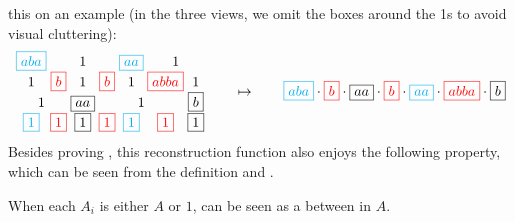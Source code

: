 this on an example (in the three views, we omit the boxes around the 1s to avoid
visual cluttering):
\[\arraycolsep=1.4pt\def\arraystretch{1.2}
  \begin{array}{ccccccc}
    \blue{\boxed{aba}}
    & & 1 & &
    \blue{\boxed{aa}} & \multicolumn{2}{c}{1} \\
    1 &
    \red{\boxed{b}} &  
    1 & 
    \red{\boxed{b}} & 
    1 & 
      \red{\boxed{abba}} & 1\\
     \multicolumn{2}{c}{1} & 
    \boxed{aa} & \multicolumn{3}{c}{1} & 
    \boxed{b}\\
    \blue{\boxed{1}} &
    \red{\boxed{1}} &
    \boxed{1} &
    \red{\boxed{1}} &
    \blue{\boxed{1}} &
    \red{\boxed{1}} &
    \boxed{1}
  \end{array}
  \qquad\mapsto\qquad \blue{\boxed{aba}} \cdot 
  \red{\boxed{b}} \cdot 
  \boxed{aa} \cdot 
  \red{\boxed{b}} \cdot 
  \blue{\boxed{aa}} \cdot 
  \red{\boxed{abba}} \cdot 
  \boxed{b}
\]
Besides proving , this reconstruction function also enjoys the
following property, which can be seen from the definition and
.
\begin{proposition}\label{prop:reconstruction}
  When each $A_i$ is either $A$ or $1$,  can be seen as a  between  in $A$.
\end{proposition}
